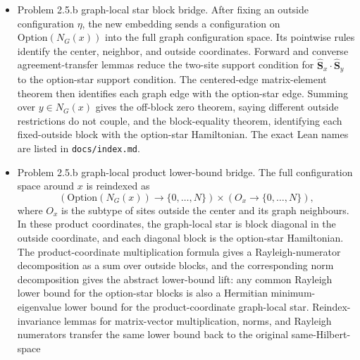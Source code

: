 \documentclass[a4paper,11pt]{article}
\begin{document}
\begin{itemize}
        \texttt{transportedSingleClusterHamiltonianS} is exactly the sum of
        transported center-leaf dot products.  The canonical equivalence
        \(\mathrm{Fin}(|s|+1)\simeq\mathrm{Option}(s)\), sending \(0\) to
        \(\mathrm{none}\) and successors to \(\mathrm{some}\) leaves via
        \texttt{Finset.equivFin}, uses the finite-sum reindexing helper
        \texttt{sum\_fin\_erase\_zero\_eq\_sum\_succ}, and yields the named
        option-star identity
        \texttt{transportedSingleClusterHamiltonianS\_option\_eq}.
  \item Problem 2.5.b graph-local star block bridge.  After fixing an outside
        configuration \(\eta\), the new embedding sends a configuration on
        \(\mathrm{Option}(N_G(x))\) into the full graph configuration space.
        Its pointwise rules identify the center, neighbor, and outside
        coordinates.  Forward and converse agreement-transfer lemmas reduce
        the two-site support condition for
        \(\hat{\mathbf S}_x\cdot\hat{\mathbf S}_y\) to the option-star support
        condition.  The centered-edge matrix-element theorem then identifies
        each graph edge with the option-star edge.  Summing over
        \(y\in N_G(x)\) gives the off-block zero theorem, saying different
        outside restrictions do not couple, and the block-equality theorem,
        identifying each fixed-outside block with the option-star Hamiltonian.
        The exact Lean names are listed in \texttt{docs/index.md}.
  \item Problem 2.5.b graph-local product lower-bound bridge.  The full
        configuration space around \(x\) is reindexed as
        \[
          (\mathrm{Option}(N_G(x))\to\{0,\ldots,N\})
          \times
          (O_x\to\{0,\ldots,N\}),
        \]
        where \(O_x\) is the subtype of sites outside the center and its
        graph neighbours.  In these product coordinates, the graph-local star
        is block diagonal in the outside coordinate, and each diagonal block is
        the option-star Hamiltonian.  The product-coordinate multiplication
        formula gives a Rayleigh-numerator decomposition as a sum over outside
        blocks, and the corresponding norm decomposition gives the abstract
        lower-bound lift: any common Rayleigh lower bound for the option-star
        blocks is also a Hermitian minimum-eigenvalue lower bound for the
        product-coordinate graph-local star.  Reindex-invariance lemmas for
        matrix-vector multiplication, norms, and Rayleigh numerators transfer
        the same lower bound back to the original same-Hilbert-space

\end{itemize}
\end{document}
